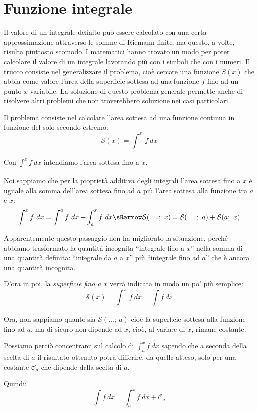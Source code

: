 \section{Funzione integrale}
\label{sec:integrali_funzione_integrale}

Il valore di un integrale definito può essere calcolato con una certa 
approssimazione attraverso le somme di Riemann finite, ma questo, a volte, 
risulta piuttosto scomodo. I matematici hanno trovato un modo per poter 
calcolare il valore di un integrale lavorando più con i simboli che con i 
numeri. Il trucco consiste nel generalizzare il problema, cioè cercare una 
funzione \(S(x)\) che abbia come valore l'area della superficie sottesa ad 
una funzione \(f\) fino ad un punto \(x\) variabile. La soluzione di questo 
problema generale permette anche di risolvere altri problemi che non 
troverebbero soluzione nei casi particolari.

Il problema consiste nel calcolare l'area sottesa ad una funzione continua in 
funzione del solo secondo estremo:
\[\mathcal{S}(x) = \int_{\dots}^x f~dx \] %

Con \(\int_{}^x f~dx\) intendiamo l'area sottesa fino a \(x\).

Noi sappiamo che per la proprietà additiva degli integrali l'area sottesa 
fino a \(x\) è uguale alla somma dell'area sottesa fino ad \(a\) più l'area 
sottesa alla funzione tra \(a\) e \(x\):
\[\int_{}^x f~dx = \int_{}^a f~dx + \int_{a}^x f~dx \sRarrow
  \mathcal{S}(\dots ;~x) = \mathcal{S}(\dots ;~a) + \mathcal{S}(a;~x)\]

Apparentemente questo passaggio non ha migliorato la situazione, perché 
abbiamo trasformato la quantità incognita ``integrale fino a \(x\)'' nella 
somma di una quantità definita: ``integrale da \(a\) a \(x\)'' più 
``integrale fino ad \(a\)'' che è ancora una quantità incognita.

D'ora in poi, la \emph{superficie fino a \(x\)} verrà indicata in modo un 
po' 
più semplice:
\[\mathcal{S}(x) = \int_{\dots}^x f~dx = \int f~dx\]

\begin{minipage}{.49 \textwidth} 
Ora, non sappiamo quanto sia \(\mathcal{S}(\dots ;~a)\) cioè la superficie 
sottesa alla funzione fino ad \(a\), ma di sicuro non dipende ad \(x\), cioè, 
al variare di \(x\), rimane costante.

Possiamo perciò concentrarci sul calcolo di \(\int_{a}^x f~dx\) sapendo che a 
seconda della scelta di \(a\) il risultato ottenuto potrà differire, da 
quello atteso, solo per una costante \(\mathcal{C}_a\)
che dipende dalla scelta di \(a\).

Quindi:
\[\int f~dx = \int_{a}^x f~dx + \mathcal{C}_a\]
\end{minipage}
\hfill
\begin{minipage}{.49 \textwidth}
\begin{inaccessibleblock}[] 
  \begin{center} \intfinox \end{center}
\end{inaccessibleblock}
\end{minipage}


